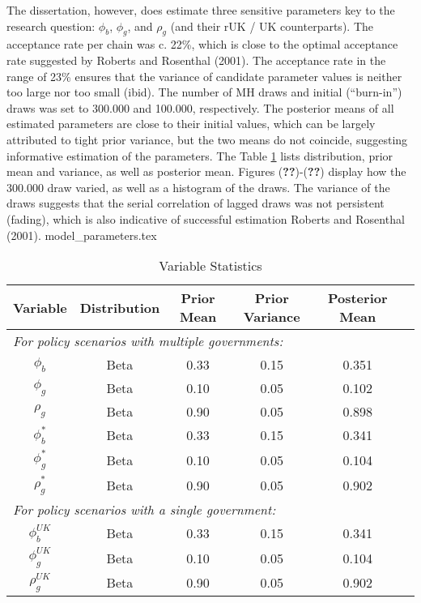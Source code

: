 The dissertation, however, does estimate three sensitive parameters key to the research question: $\phi_b$, $\phi_g$, and $\rho_g$ (and their rUK / UK counterparts). The acceptance rate per chain was c. 22\%, which is close to the optimal acceptance rate suggested by Roberts and Rosenthal (2001). The acceptance rate in the range of 23\% ensures that the variance of candidate parameter values is neither too large nor too small (ibid). The number of MH draws and initial (``burn-in'') draws was set to 300.000 and 100.000, respectively. The posterior means of all estimated parameters are close to their initial values, which can be largely attributed to tight prior variance, but the two means do not coincide, suggesting informative estimation of the parameters. The Table \ref{tab:priors_and_posteriors} lists distribution, prior mean and variance, as well as posterior mean. Figures (\textbf{??})-(\textbf{??}) display how the 300.000 draw varied, as well as a histogram of the draws. The variance of the draws suggests that the serial correlation of lagged draws was not persistent (fading), which is also indicative of successful estimation Roberts and Rosenthal (2001).
{model_parameters.tex}
\begin{table}[H]
    \centering
    \label{tab:priors_and_posteriors}
    \begin{tabular}{cccccc}
        \textbf{Variable} & \textbf{Distribution} & \textbf{Prior Mean} & \textbf{Prior Variance} & \textbf{Posterior Mean} \\
        \hline
        \multicolumn{5}{l}{\textit{For policy scenarios with multiple governments:}} \\
        $\phi_b$ & Beta & 0.33 & 0.15 & 0.351\\
        $\phi_g$ & Beta & 0.10 & 0.05 & 0.102\\
        $\rho_g$ & Beta & 0.90 & 0.05 & 0.898\\
        $\phi_b^*$ & Beta & 0.33 & 0.15 & 0.341\\
        $\phi_g^*$ & Beta & 0.10 & 0.05 & 0.104\\
        $\rho_g^*$ & Beta & 0.90 & 0.05 & 0.902\\
        \multicolumn{5}{l}{\textit{For policy scenarios with a single government:}} \\
        $\phi_b^{UK}$ & Beta & 0.33 & 0.15 & 0.341\\
        $\phi_g^{UK}$ & Beta & 0.10 & 0.05 & 0.104\\
        $\rho_g^{UK}$ & Beta & 0.90 & 0.05 & 0.902\\
    \end{tabular}
    \caption{Variable Statistics}
\end{table}
